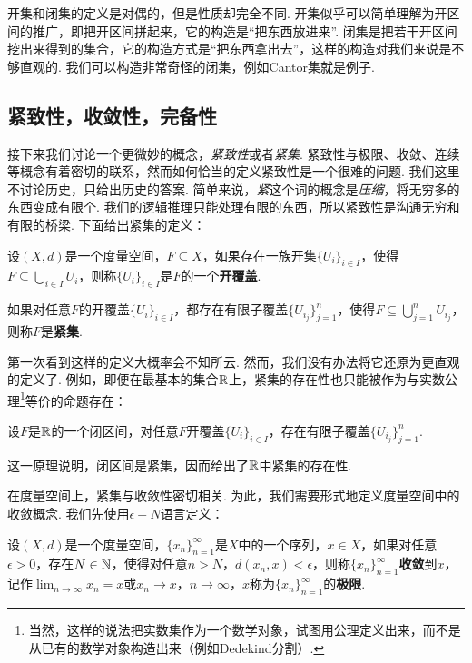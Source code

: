 开集和闭集的定义是对偶的，但是性质却完全不同. 开集似乎可以简单理解为开区间的推广，即把开区间拼起来，它的构造是“把东西放进来”. 闭集是把若干开区间挖出来得到的集合，它的构造方式是“把东西拿出去”，这样的构造对我们来说是不够直观的. 我们可以构造非常奇怪的闭集，例如Cantor集就是例子. 

\subsection{紧致性，收敛性，完备性}

接下来我们讨论一个更微妙的概念，\textit{紧致性}或者\textit{紧集}. 紧致性与极限、收敛、连续等概念有着密切的联系，然而如何恰当的定义紧致性是一个很难的问题. 我们这里不讨论历史，只给出历史的答案. 简单来说，\textit{紧}这个词的概念是\textit{压缩}，将无穷多的东西变成有限个. 我们的逻辑推理只能处理有限的东西，所以紧致性是沟通无穷和有限的桥梁. 下面给出紧集的定义：

\begin{definition}[开覆盖，紧集]
    设$(X,d)$是一个度量空间，$F\subseteq X$，如果存在一族开集$\{U_i\}_{i\in I}$，使得$F\subseteq \bigcup_{i\in I}U_i$，则称$\{U_i\}_{i\in I}$是$F$的一个\textbf{开覆盖}. 
    
    如果对任意$F$的开覆盖$\{U_i\}_{i\in I}$，都存在有限子覆盖$\{U_{i_j}\}_{j=1}^n$，使得$F\subseteq \bigcup_{j=1}^nU_{i_j}$，则称$F$是\textbf{紧集}. 
\end{definition}

第一次看到这样的定义大概率会不知所云. 然而，我们没有办法将它还原为更直观的定义了. 例如，即便在最基本的集合$\mathbb{R}$上，紧集的存在性也只能被作为与实数公理\footnote{当然，这样的说法把实数集作为一个数学对象，试图用公理定义出来，而不是从已有的数学对象构造出来（例如Dedekind分割）. }等价的命题存在：

\begin{proposition}\label{proposition:heine-borel}
设$F$是$\mathbb{R}$的一个闭区间，对任意$F$开覆盖$\{U_i\}_{i\in I}$，存在有限子覆盖$\{U_{i_j}\}_{j=1}^n$.
\end{proposition}

这一原理说明，闭区间是紧集，因而给出了$\mathbb{R}$中紧集的存在性. 

在度量空间上，紧集与收敛性密切相关. 为此，我们需要形式地定义度量空间中的收敛概念. 我们先使用$\epsilon-N$语言定义：

\begin{definition}[收敛，极限]
    设$(X,d)$是一个度量空间，$\{x_n\}_{n=1}^\infty$是$X$中的一个序列，$x\in X$，如果对任意$\epsilon>0$，存在$N\in\mathbb{N}$，使得对任意$n>N$，$d(x_n,x)<\epsilon$，则称$\{x_n\}_{n=1}^\infty$\textbf{收敛}到$x$，记作$\lim_{n\to\infty}x_n=x$或$x_n\to x$，$n\to\infty$，$x$称为$\{x_n\}_{n=1}^\infty$的\textbf{极限}. 
\end{definition}

